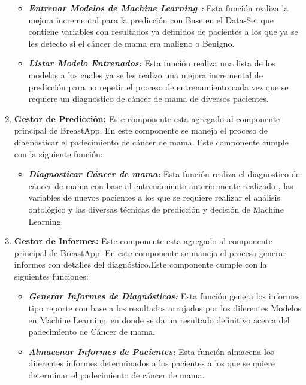 \begin{enumerate}[label=\textbf{\arabic*})]
	\begin{itemize}
		\item  \textbf{\textit{Entrenar Modelos de Machine Learning :}} Esta función realiza la mejora incremental para la predicción con Base en el Data-Set que contiene variables con resultados ya definidos de pacientes a los que ya se les detecto si el cáncer de mama era maligno o Benigno.
		
		\item  \textbf{\textit{Listar Modelo Entrenados:}} Esta función realiza una lista de los modelos a  los cuales ya se les realizo una mejora incremental de predicción para no repetir el proceso de entrenamiento cada vez que se requiere un diagnostico de cáncer de mama de diversos pacientes.
	\end{itemize}

\newpage
\item  \textbf{Gestor de Predicción:} Este componente esta agregado al componente principal de BreastApp. En este componente se maneja el proceso de diagnosticar el padecimiento de cáncer de mama. Este componente cumple con la siguiente función:
	\begin{itemize}
		\item  \textbf{\textit{Diagnosticar Cáncer de mama:}} Esta función realiza el diagnostico de cáncer de mama con base al entrenamiento anteriormente realizado , las variables de nuevos pacientes a los que se requiere realizar el análisis ontológico y las diversas técnicas de predicción y decisión de Machine Learning. 
	\end{itemize}

\item  \textbf{Gestor de Informes:} Este componente esta agregado al componente principal de BreastApp. En este componente se maneja el proceso generar informes con detalles del diagnóstico.Este componente cumple con la siguientes funciones:

\begin{itemize}
	\item  \textbf{\textit{Generar Informes de Diagnósticos:}} Esta función genera los informes tipo reporte con base a los resultados arrojados por los diferentes Modelos en Machine Learning, en donde se da un resultado definitivo acerca del  padecimiento de Cáncer de mama.
	
	\item  \textbf{\textit{Almacenar Informes de Pacientes:}} Esta función almacena los diferentes informes determinados a los pacientes a los que se quiere determinar el padecimiento de cáncer de mama.
\end{itemize}


\end{enumerate}
